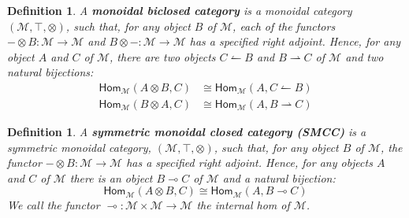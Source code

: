 \documentclass{article}
\newtheorem{definition}[theorem]{Definition}
\let\mto\to
\let\to\relax
\newcommand{\to}{\rightarrow}
\newcommand{\cat}[1]{\mathcal{#1}}
\newcommand{\Hom}[3]{\mathsf{Hom}_{\cat{#1}}(#2,#3)}
\newcommand{\limp}[0]{\multimap}
\begin{document}
\begin{definition}
  \label{def:monoidal-biclosed-category}
  A \textbf{monoidal biclosed category} is a monoidal category
  $(\cat{M},\top,\otimes)$, such that, for any object $B$ of $\cat{M}$,
  each of the functors $-\otimes B:\cat{M}\mto\cat{M}$ and
  $B\otimes -:\cat{M}\mto\cat{M}$ has a specified right adjoint. Hence,
  for any object $A$ and $C$ of $\cat{M}$, there are two objects
  $C\leftharpoonup B$ and $B\rightharpoonup C$ of $\cat{M}$ and two
  natural bijections:
  \begin{align*}
  \Hom{\cat{M}}{A\otimes B}{C} &\cong
    \Hom{\cat{M}}{A}{C\leftharpoonup B} \\
  \Hom{\cat{M}}{B \otimes A}{C} &\cong
    \Hom{\cat{M}}{A}{B \rightharpoonup C}
  \end{align*}
\end{definition}

\begin{definition}
  \label{def:SMCC}
  A \textbf{symmetric monoidal closed category (SMCC)} is a symmetric
  monoidal category, $(\cat{M},\top,\otimes)$, such that, for any object
  $B$ of $\cat{M}$, the functor $- \otimes B : \cat{M} \mto \cat{M}$
  has a specified right adjoint.  Hence, for any objects $A$ and $C$
  of $\cat{M}$ there is an object $B \limp C$ of $\cat{M}$ and a
  natural bijection:
  \[
  \Hom{\cat{M}}{A \otimes B}{C} \cong \Hom{\cat{M}}{A}{B \limp C}
  \]
  We call the functor $\limp : \cat{M} \times \cat{M} \mto \cat{M}$
  the internal hom of $\cat{M}$.
\end{definition}
\end{document}
